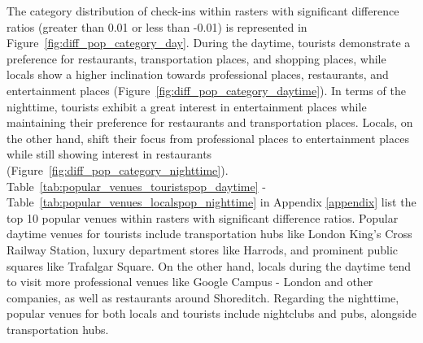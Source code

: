 \documentclass{article}
\theoremstyle{remark}
\begin{document}
The category distribution of check-ins within rasters with significant difference ratios (greater than 0.01 or less than -0.01) is represented in Figure~\ref{fig:diff_pop_category_day}. During the daytime, tourists demonstrate a preference for restaurants, transportation places, and shopping places, while locals show a higher inclination towards professional places, restaurants, and entertainment places (Figure~\ref{fig:diff_pop_category_daytime}). In terms of the nighttime, tourists exhibit a great interest in entertainment places while maintaining their preference for restaurants and transportation places. Locals, on the other hand, shift their focus from professional places to entertainment places while still showing interest in restaurants (Figure~\ref{fig:diff_pop_category_nighttime}). 
Table~\ref{tab:popular_venues_touristspop_daytime} - Table~\ref{tab:popular_venues_localspop_nighttime} in Appendix \ref{appendix} list the top 10 popular venues within rasters with significant difference ratios. Popular daytime venues for tourists include transportation hubs like London King's Cross Railway Station, luxury department stores like Harrods, and prominent public squares like Trafalgar Square. On the other hand, locals during the daytime tend to visit more professional venues like Google Campus - London and other companies, as well as restaurants around Shoreditch. Regarding the nighttime, popular venues for both locals and tourists include nightclubs and pubs, alongside transportation hubs.
\end{document}
